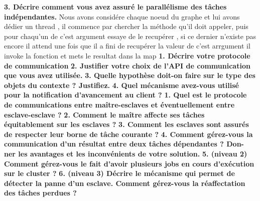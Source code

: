 \documentclass{article}
\begin{document}
\textbf{3. Décrire comment vous avez assuré le parallélisme des tâches indépendantes.}
\newline
\newline
    Nous avons considére chaque noeud du graphe et lui avons dédier un thread , il commence par chercher la 
    méthode qu'il doit appeler, puis pour chaqu'un de c'est argument essaye de le recupérer , si ce dernier n'existe pas encore 
    il attend une fois que il a fini de recupérer la valeur de c'est arrgument il invoke la fonction et mets le resultat dans la map
\newline
\newline
\textbf{1. Décrire votre protocole de communication}
\newline
\newline
\textbf{2. Justifier votre choix de l’API de communication que vous avez utilisée.}
\newline
\newline
\textbf{3. Quelle hypothèse doit-on faire sur le type des objets du contexte ? Justifiez.}
\newline
\newline
\textbf{4. Quel mécanisme avez-vous utilisé pour la notification d’avancement au client ?}
\newline
\newline
\textbf{1. Quel est le protocole de communications entre maître-esclaves et éventuellement entre
esclave-esclave ?}
\newline
\newline
\textbf{2. Comment le maître affecte ses tâches équitablement sur les esclaves ?}
\newline
\newline
\textbf{3. Comment les esclaves sont assurés de respecter leur borne de tâche courante ?}
\newline
\newline
\textbf{4. Comment gérez-vous la communication d’un résultat entre deux tâches dépendantes ? Don-
ner les avantages et les inconvénients de votre solution.}
\newline
\newline
\textbf{5. (niveau 2) Comment gérez-vous le fait d’avoir plusieurs jobs en cours d’exécution sur le
cluster ?}
\newline
\newline
\textbf{6. (niveau 3) Décrire le mécanisme qui permet de détecter la panne d’un esclave. Comment
gérez-vous la réaffectation des tâches perdues ?}
\end{document}

